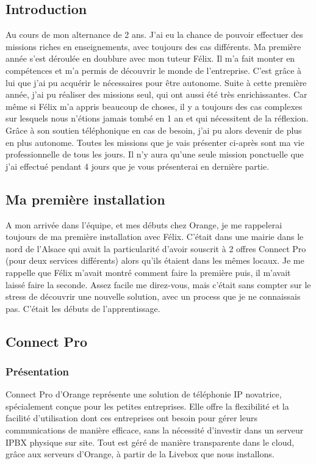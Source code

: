 \documentclass[12pt, a4paper]{article}
\begin{document}
\subsection{Introduction}
Au cours de mon alternance de 2 ans. J'ai eu la chance
de pouvoir effectuer des missions riches en 
enseignements, avec toujours des cas différents. 
Ma première année s'est déroulée en doublure avec 
mon tuteur Félix. Il m'a fait monter en compétences
et m'a permis de découvrir le monde de l'entreprise.
C'est grâce à lui que j'ai pu acquérir le
nécessaires pour être autonome. Suite à cette première
année, j'ai pu réaliser des missions seul, qui ont aussi 
été très enrichissantes. Car même si Félix m'a appris 
beaucoup de choses, il y a toujours des cas complexes 
sur lesquels nous n'étions jamais tombé en 1 an et
qui nécessitent de la réflexion. Grâce à son soutien 
téléphonique en cas de besoin, j'ai pu alors
devenir de plus en plus autonome. Toutes les missions 
que je vais présenter ci-après sont ma vie professionnelle
de tous les jours. Il n'y aura qu'une seule mission 
ponctuelle que j'ai effectué pendant 4 jours que je 
vous présenterai en dernière partie.

\subsection{Ma première installation}
A mon arrivée dans l'équipe, et mes débuts chez Orange, 
je me rappelerai toujours de ma première installation 
avec Félix. C'était dans une mairie dans le nord
de l'Alsace qui avait la particularité d'avoir 
souscrit à 2 offres Connect Pro (pour deux services différents) 
alors qu'ils étaient dans les mêmes locaux. Je me rappelle que Félix m'avait
montré comment faire la première puis, il m'avait laissé
faire la seconde. Assez facile me direz-vous, mais
c'était sans compter sur le stress de découvrir 
une nouvelle solution, avec un process que je ne connaissais 
pas. C'était les débuts de l'apprentissage. 

\subsection{Connect Pro}
\subsubsection{Présentation}
Connect Pro d'Orange représente une solution
de téléphonie IP novatrice, spécialement conçue pour
les petites entreprises. Elle offre la flexibilité et
la facilité d'utilisation dont ces entreprises ont
besoin pour gérer leurs communications de manière
efficace, sans la nécessité d'investir dans un
serveur IPBX physique sur site. Tout est géré de
manière transparente dans le cloud, grâce aux
serveurs d'Orange, à partir de la Livebox
que nous installons.\\
\end{document}
